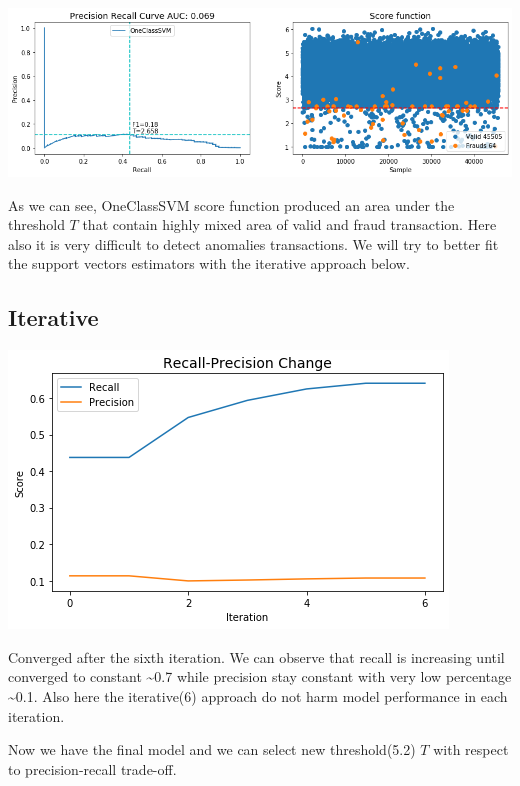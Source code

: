 \documentclass[20pt,a4paper]{article}
\begin{document}
    \begin{center}
    \includegraphics[scale=0.45]{graphs/output_65_0.png}
    \end{center}
    
    
    As we can see, OneClassSVM score function produced an area under the
threshold \(T\) that contain highly mixed area of valid and fraud
transaction. Here also it is very difficult to detect anomalies
transactions. We will try to better fit the support vectors estimators
with the iterative approach below.

\subsection{Iterative}
\begin{center}
\includegraphics[scale=0.45]{graphs/output_69_0.png}
\end{center}

    Converged after the sixth iteration. We can observe that recall is increasing until converged to
constant \textasciitilde{}0.7 while precision stay constant with very
low percentage \textasciitilde{}0.1. Also here the iterative(6) approach do
not harm model performance in each iteration.

Now we have the final model and we can select new threshold(5.2) $T$ with
respect to precision-recall trade-off.
\end{document}
